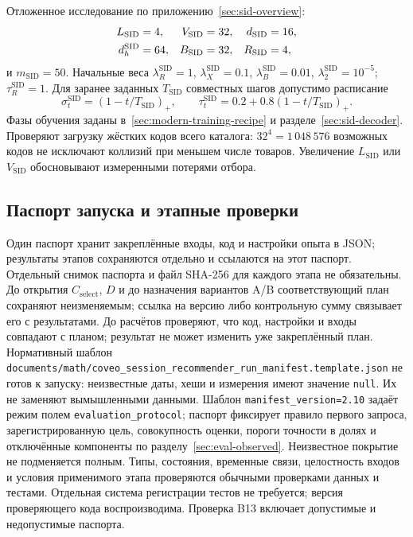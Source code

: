 \documentclass[12pt,a4paper]{article}
\newcommand{\code}[1]{{\ttfamily\small\nolinkurl{#1}}}
\newcommand{\pos}[1]{\left(#1\right)_+}
\theoremstyle{plainru}
\begin{document}
Отложенное исследование по приложению~\ref{sec:sid-overview}:
\begin{align}
L_{\mathrm{SID}}&=4,&V_{\mathrm{SID}}&=32,&d_{\mathrm{SID}}&=16,\notag\\
d_h^{\mathrm{SID}}&=64,&B_{\mathrm{SID}}&=32,&R_{\mathrm{SID}}&=4,
\label{eq:app-sid-start}
\end{align}
и $m_{\mathrm{SID}}=50$. Начальные веса
$\lambda_R^{\mathrm{SID}}=1$,
$\lambda_X^{\mathrm{SID}}=0.1$,
$\lambda_B^{\mathrm{SID}}=0.01$,
$\lambda_2^{\mathrm{SID}}=10^{-5}$; $\tau_R^{\mathrm{SID}}=1$.
Для заранее заданных $T_{\mathrm{SID}}$ совместных шагов допустимо
расписание
\begin{equation}\label{eq:app-sid-schedule}
\sigma_t^{\mathrm{SID}}=\pos{1-t/T_{\mathrm{SID}}},\qquad
\tau_t^{\mathrm{SID}}=0.2+0.8\pos{1-t/T_{\mathrm{SID}}}.
\end{equation}
Фазы обучения заданы в~\ref{sec:modern-training-recipe}
и разделе~\ref{sec:sid-decoder}. Проверяют загрузку жёстких кодов
всего каталога: $32^4=1\,048\,576$ возможных кодов не исключают
коллизий при меньшем числе товаров. Увеличение $L_{\mathrm{SID}}$
или $V_{\mathrm{SID}}$ обосновывают измеренными потерями отбора.


\subsection{Паспорт запуска и этапные проверки}
\label{app:run-manifest}

Один паспорт хранит закреплённые входы,
код и настройки опыта в JSON; результаты этапов сохраняются отдельно
и ссылаются на этот паспорт. Отдельный снимок паспорта и файл SHA-256
для каждого этапа не обязательны. До открытия $C_{\mathrm{select}}$,
$D$ и до назначения вариантов A/B соответствующий план сохраняют
неизменяемым; ссылка на версию либо контрольную сумму связывает его
с результатами. До расчётов проверяют, что код, настройки и входы
совпадают с планом; результат не может изменить уже закреплённый план.
Нормативный шаблон
\code{documents/math/coveo_session_recommender_run_manifest.template.json}
не готов к запуску: неизвестные даты, хеши и измерения имеют значение
\code{null}. Их не заменяют вымышленными данными.
Шаблон \code{manifest_version=2.10} задаёт режим полем
\code{evaluation_protocol}; паспорт фиксирует
правило первого запроса, зарегистрированную цель, совокупность оценки,
пороги точности в долях и отключённые компоненты
по разделу~\ref{sec:eval-observed}. Неизвестное покрытие не подменяется полным.
Типы, состояния, временные связи, целостность входов и условия применимого этапа
проверяются обычными проверками данных и тестами. Отдельная система
регистрации тестов не требуется; версия проверяющего кода воспроизводима.
Проверка B13 включает допустимые и недопустимые паспорта.
\end{document}
